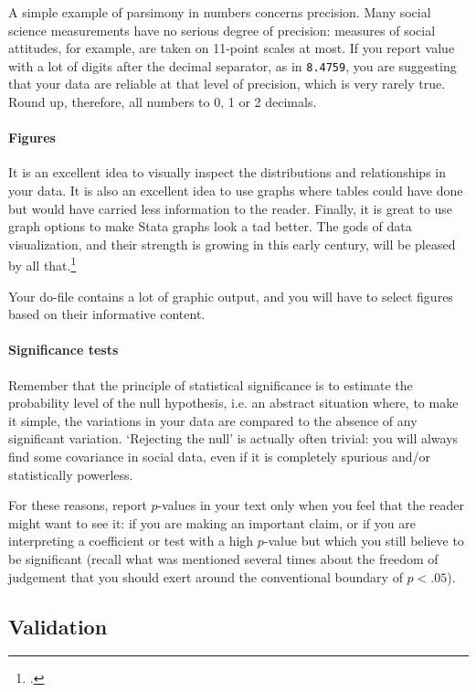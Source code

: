 A simple example of parsimony in numbers concerns precision. Many social science measurements have no serious degree of precision: measures of social attitudes, for example, are taken on 11-point scales at most. If you report value with a lot of digits after the decimal separator, as in \texttt{8.4759}, you are suggesting that your data are reliable at that level of precision, which is very rarely true. Round up, therefore, all numbers to 0, 1 or 2 decimals.

\paragraph{Figures} It is an excellent idea to visually inspect the distributions and relationships in your data. It is also an excellent idea to use graphs where tables could have done but would have carried less information to the reader. Finally, it is great to use graph options to make Stata graphs look a tad better. The gods of data visualization, and their strength is growing in this early century, will be pleased by all that.\footcite{Tufte:2001t}

Your do-file contains a lot of graphic output, and you will have to select figures based on their informative content.

\paragraph{Significance tests} Remember that the principle of statistical significance is to estimate the probability level of the null hypothesis, i.e. an abstract situation where, to make it simple, the variations in your data are compared to the absence of any significant variation. `Rejecting the null' is actually often trivial: you will always find some covariance in social data, even if it is completely spurious and/or statistically powerless.

For these reasons, report $p$-values in your text only when you feel that the reader might want to see it: if you are making an important claim, or if you are interpreting a coefficient or test with a high $p$-value but which you still believe to be significant (recall what was mentioned several times about the freedom of judgement that you should exert around the conventional boundary of $p < .05$).

\subsection{Validation}

